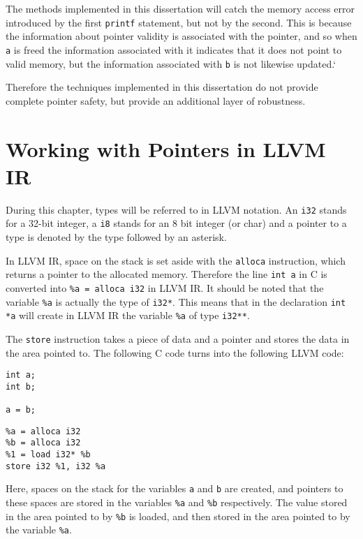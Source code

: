 The methods implemented in this dissertation will catch the memory access error introduced by the first \verb!printf! statement, but not by the second.
This is because the information about pointer validity is associated with the pointer, and so when \verb!a! is freed the information associated with it indicates that it does not point to valid memory, but the information associated with \verb!b! is not likewise updated.`

Therefore the techniques implemented in this dissertation do not provide complete pointer safety, but provide an additional layer of robustness.

\section{Working with Pointers in LLVM IR}

During this chapter, types will be referred to in LLVM notation.
An \verb!i32! stands for a 32-bit integer, a \verb!i8! stands for an 8 bit integer (or char) and a pointer to a type is denoted by the type followed by an asterisk.

In LLVM IR, space on the stack is set aside with the \verb!alloca! instruction, which returns a pointer to the allocated memory.
Therefore the line \verb!int a! in C is converted into \verb!%a = alloca i32! in LLVM IR.
It should be noted that the variable \verb!%a! is actually the type of \verb!i32*!.
This means that in the declaration \verb!int *a! will create in LLVM IR the variable \verb!%a! of type \verb!i32**!.

The \verb!store! instruction takes a piece of data and a pointer and stores the data in the area pointed to.
The following C code turns into the following LLVM code:

\begin{minipage}[t]{0.5\linewidth}
\begin{verbatim}
int a;
int b;

a = b;
\end{verbatim}
\end{minipage}
\begin{minipage}[t]{0.5\linewidth}
\begin{verbatim}
%a = alloca i32
%b = alloca i32
%1 = load i32* %b
store i32 %1, i32 %a
\end{verbatim}
\end{minipage}

Here, spaces on the stack for the variables \verb!a! and \verb!b! are created, and pointers to these spaces are stored in the variables \verb!%a! and \verb!%b! respectively.
The value stored in the area pointed to by \verb!%b! is loaded, and then stored in the area pointed to by the variable \verb!%a!.


